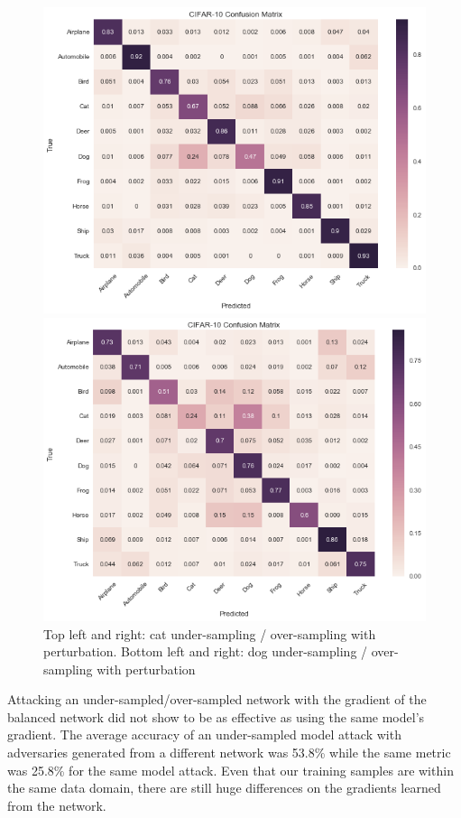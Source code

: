 \documentclass[runningheads,a4paper]{llncs}
\begin{document}
\begin{figure}
\begin{minipage}[b]{0.55\linewidth}
	\end{minipage} 
	\begin{minipage}[b]{0.55\linewidth}
		\centering
		\includegraphics[width=1\linewidth]{dog_undersampling_per.png} 
	\end{minipage}%
	\begin{minipage}[b]{0.55\linewidth}
		\centering
		\includegraphics[width=1\linewidth]{dog_oversampling_per.png} 
	\end{minipage} 
	\centering
	\caption{Top left and right: cat under-sampling / over-sampling with perturbation. Bottom left and right: dog under-sampling / over-sampling with perturbation}
	\label{fig:overlap}
\end{figure}
Attacking an under-sampled/over-sampled network with the gradient of the balanced network did not show to be as effective as using the same model's gradient. The average accuracy of an under-sampled model attack with adversaries generated from a different network was 53.8\% while the same metric was 25.8\% for the same model attack. Even that our training samples are within the same data domain, there are still huge differences on the gradients learned from the network. 
\end{document}
